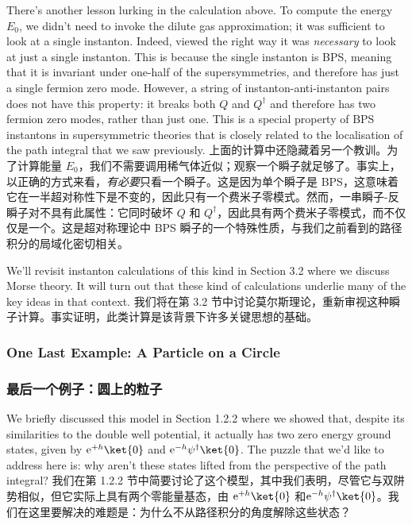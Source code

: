 \documentclass{article}
\newcommand{\rme}{\mathrm{e}}
\begin{document}
\begin{paracol}{2}
There’s another lesson lurking in the calculation above. To compute the energy $E_0$, we didn’t need to invoke the dilute gas approximation; it was suﬃcient to look at a single instanton. Indeed, viewed the right way it was \textit{necessary} to look at just a single instanton. This is because the single instanton is BPS, meaning that it is invariant under one-half of the supersymmetries, and therefore has just a single fermion zero mode. However, a string of instanton-anti-instanton pairs does not have this property: it breaks both $Q$ and $Q^{\dagger}$ and therefore has two fermion zero modes, rather than just one. This is a special property of BPS instantons in supersymmetric theories that is closely related to the localisation of the path integral that we saw previously.
\switchcolumn
上面的计算中还隐藏着另一个教训。为了计算能量 $E_0$，我们不需要调用稀气体近似；观察一个瞬子就足够了。事实上，以正确的方式来看，\textit{有必要}只看一个瞬子。这是因为单个瞬子是 BPS，这意味着它在一半超对称性下是不变的，因此只有一个费米子零模式。然而，一串瞬子-反瞬子对不具有此属性：它同时破坏 $Q$ 和 $Q^{\dagger}$，因此具有两个费米子零模式，而不仅仅是一个。这是超对称理论中 BPS 瞬子的一个特殊性质，与我们之前看到的路径积分的局域化密切相关。
\switchcolumn*

We’ll revisit instanton calculations of this kind in Section 3.2 where we discuss Morse theory. It will turn out that these kind of calculations underlie many of the key ideas in that context.
\switchcolumn
我们将在第 3.2 节中讨论莫尔斯理论，重新审视这种瞬子计算。事实证明，此类计算是该背景下许多关键思想的基础。
\switchcolumn*

\subsubsection{One Last Example: A Particle on a Circle}
\switchcolumn
\subsubsection*{最后一个例子：圆上的粒子}
\switchcolumn*

We briefly discussed this model in Section 1.2.2 where we showed that, despite its similarities to the double well potential, it actually has two zero energy ground states, given by $\rme^{+ h} \ket{0}$ and $\rme^{- h} \psi^{\dagger} \ket{0}$. The puzzle that we’d like to address here is: why aren’t these states lifted from the perspective of the path integral?
\switchcolumn
我们在第 1.2.2 节中简要讨论了这个模型，其中我们表明，尽管它与双阱势相似，但它实际上具有两个零能量基态，由 $\rme^{+ h} \ket{0}$ 和$\rme^{- h} \psi^{\dagger} \ket{0}$。我们在这里要解决的难题是：为什么不从路径积分的角度解除这些状态？
\switchcolumn*


\end{paracol}
\end{document}
